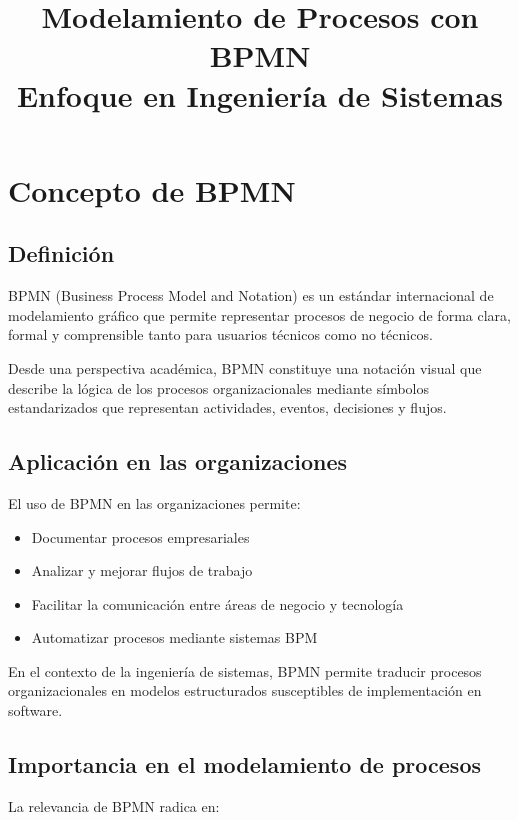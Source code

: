 \documentclass[12pt,a4paper]{article}
\title{\textbf{Modelamiento de Procesos con BPMN}\\
\large Enfoque en Ingeniería de Sistemas}
\author{}
\date{}
\begin{document}
\maketitle

\tableofcontents
\newpage

\section{Concepto de BPMN}

\subsection{Definición}

BPMN (Business Process Model and Notation) es un estándar internacional de modelamiento gráfico que permite representar procesos de negocio de forma clara, formal y comprensible tanto para usuarios técnicos como no técnicos.

Desde una perspectiva académica, BPMN constituye una notación visual que describe la lógica de los procesos organizacionales mediante símbolos estandarizados que representan actividades, eventos, decisiones y flujos.

\subsection{Aplicación en las organizaciones}

El uso de BPMN en las organizaciones permite:

\begin{itemize}
    \item Documentar procesos empresariales
    \item Analizar y mejorar flujos de trabajo
    \item Facilitar la comunicación entre áreas de negocio y tecnología
    \item Automatizar procesos mediante sistemas BPM
\end{itemize}

En el contexto de la ingeniería de sistemas, BPMN permite traducir procesos organizacionales en modelos estructurados susceptibles de implementación en software.

\subsection{Importancia en el modelamiento de procesos}

La relevancia de BPMN radica en:
\end{document}
